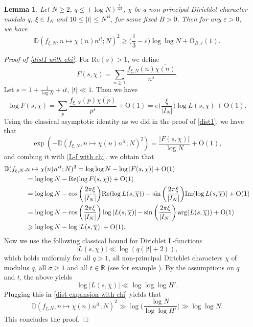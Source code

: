 \documentclass[letter,11pt]{article}
\theoremstyle{plain} %
\newtheorem{lemma}[theorem]{Lemma}
\theoremstyle{definition} %
\theoremstyle{plain}
\theoremstyle{plain}
\theoremstyle{plain}
\numberwithin{equation}{section}
\newcommand{\Oh}{{\mathrm O}}
\newcommand{\R}{\mathbb{R}}
\renewcommand{\epsilon}{\varepsilon}
\renewcommand{\leq}{\leqslant}
\renewcommand{\geq}{\geqslant}
\renewcommand{\Re}{\mathrm{Re}}
\renewcommand{\Im}{\mathrm{Im}}
\newcommand{\Dist}{\mathbb{D}}
\newcommand{\1}{\mathbbm{1}}
\newcommand{\f}{f_{\xi,N}}
\begin{document}
\begin{lemma}\label{dist2 with chi}
Let $N\geq 2$, $q\leq (\log{N})^\frac{1}{125}$, $\chi$ be a non-principal Dirichlet character modulo $q$, 
$\xi\in I_N$ and $10\leq |t|\leq N^B$, for some fixed $B>0$. Then for any $\epsilon>0,$ we have
$$\Dist(\f,n\mapsto \chi(n)n^{it}; N)^2 \geq \bigg(\frac{1}{3}-\epsilon\bigg)\log\log{N} + \Oh_{B,\epsilon}(1).$$
\end{lemma}

\begin{proof}[Proof of \cref{dist1 with chi}]
For $\Re(s)>1$, we define 
$$F(s,\chi)=\sum_{n\geq1}\frac{\f(n)\overline{\chi(n)}}{n^s}.$$ 
Let $s=1+\frac{1}{\log{N}}+it$, $|t|\ll1$. Then we have
\begin{equation}\label{L-f with chi}
    \log{F(s,\chi)} = \sum_{p}\frac{\f(p)\overline{\chi(p)}}{p^s} + \Oh(1) 
    = e\bigg(\frac{\xi}{|I_N|}\bigg)\log{L(s,\overline{\chi})} + \Oh(1).
\end{equation}
Using the classical asymptotic identity \cite[Eq. (2.2)]{GS_large_char_sums} as we did in the proof of \cref{dist1}, we have that
$$\exp(-\Dist(\f,n\mapsto \chi(n)n^{it};N)^2)=\frac{|F(s,\chi)|}{\log{N}} + \Oh(1),$$ 
and combing it with \eqref{L-f with chi}, we obtain that
\begin{align}\label{dist expansion with chi}
    \Dist(\f,&n\mapsto\chi(n)n^{it};N)^2
    = \log\log{N} - \log|F(s,\chi)| + \Oh(1) \notag \\
    & = \log\log{N} - \Re(\log{F(s,\chi)}) + \Oh(1) \notag \\
    & = \log\log{N} - \cos\bigg(\frac{2\pi\xi}{|I_N|}\bigg)\Re(\log{L(s,\overline{\chi})})
    -\sin\bigg(\frac{2\pi\xi}{|I_N|}\bigg)\Im(\log{L(s,\overline{\chi}})) + \Oh(1) \notag \\
    & = \log\log{N} - \cos\bigg(\frac{2\pi\xi}{|I_N|}\bigg)\log|L(s,\overline{\chi})|
    - \sin\bigg(\frac{2\pi\xi}{|I_N|}\bigg)\arg(L(s,\overline{\chi})) + \Oh(1) \notag \\
    & \geq \log\log{N} - \log|L(s,\overline{\chi})| + \Oh(1).
\end{align}
Now we use the following classical bound for Dirichlet L-functions
$$|L(s,\overline{\chi})|\ll \log(q(|t|+2)),$$
which holds uniformly for all $q>1$, all non-principal Dirichlet characters $\chi$
of modulus $q$, all $\sigma\geq1$ and all $t\in\R$ (see for example \cite[Theorem 8.18]{Tenenbaum_book}).
By the assumptions on $q$ and $t$, the above yields 
$$\log|L(s,\overline{\chi})|\ll \log\log\log{H'}.$$
Plugging this in \eqref{dist expansion with chi} yields that
$$\Dist(\f,n\mapsto \chi(n)n^{it};N)^2
\gg \log\bigg(\frac{\log{N}}{\log\log{H'}}\bigg) \gg \log\log{N}.$$
This concludes the proof.
\end{proof}
\end{document}
